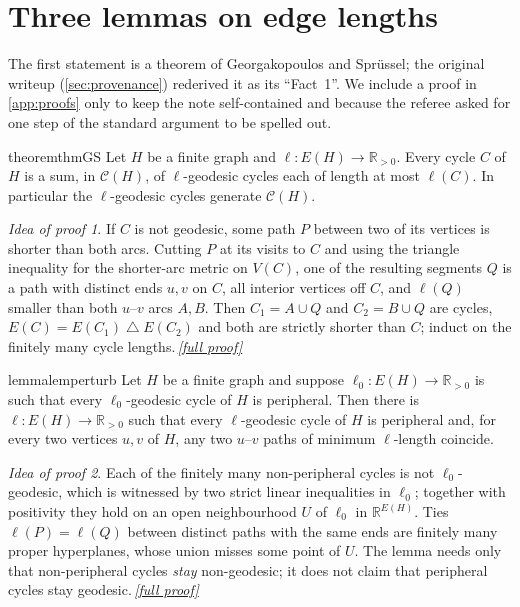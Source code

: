 \documentclass[11pt,a4paper]{article}
\theoremstyle{plain}
\theoremstyle{definition}
\theoremstyle{remark}
\newtheorem*{proofidea}{Idea of proof}
\newcommand{\fullproofref}[1]{\,\hyperref[#1]{\textit{[full proof]}}}
\newcommand{\R}{\mathbb R}
\newcommand{\cyc}{\mathcal C}
\newcommand{\symdiff}{\mathbin{\triangle}}
\begin{document}
\section{Three lemmas on edge lengths}

The first statement is a theorem of Georgakopoulos and Sprüssel; the original writeup (\cref{sec:provenance}) rederived it as its ``Fact~1''. We include a proof in \cref{app:proofs} only to keep the note self-contained and because the referee asked for one step of the standard argument to be spelled out.

\begin{restatable}{theorem}{thmGS}\label{thm:GS}
Let $H$ be a finite graph and $\ell\colon E(H)\to\R_{>0}$. Every cycle $C$ of $H$ is a sum, in $\cyc(H)$, of $\ell$-geodesic cycles each of length at most $\ell(C)$. In particular the $\ell$-geodesic cycles generate $\cyc(H)$.
\end{restatable}
\begin{proofidea}
If $C$ is not geodesic, some path $P$ between two of its vertices is shorter than both arcs. Cutting $P$ at its visits to $C$ and using the triangle inequality for the shorter-arc metric on $V(C)$, one of the resulting segments $Q$ is a path with distinct ends $u,v$ on $C$, all interior vertices off $C$, and $\ell(Q)$ smaller than both $u$--$v$ arcs $A,B$. Then $C_1=A\cup Q$ and $C_2=B\cup Q$ are cycles, $E(C)=E(C_1)\symdiff E(C_2)$ and both are strictly shorter than $C$; induct on the finitely many cycle lengths.\fullproofref{pf:GS}
\end{proofidea}

\begin{restatable}{lemma}{lemperturb}\label{lem:perturb}
Let $H$ be a finite graph and suppose $\ell_0\colon E(H)\to\R_{>0}$ is such that every $\ell_0$-geodesic cycle of $H$ is peripheral. Then there is $\ell\colon E(H)\to\R_{>0}$ such that every $\ell$-geodesic cycle of $H$ is peripheral and, for every two vertices $u,v$ of $H$, any two $u$--$v$ paths of minimum $\ell$-length coincide.
\end{restatable}
\begin{proofidea}
Each of the finitely many non-peripheral cycles is not $\ell_0$-geodesic, which is witnessed by two strict linear inequalities in $\ell_0$; together with positivity they hold on an open neighbourhood $U$ of $\ell_0$ in $\R^{E(H)}$. Ties $\ell(P)=\ell(Q)$ between distinct paths with the same ends are finitely many proper hyperplanes, whose union misses some point of $U$. The lemma needs only that non-peripheral cycles \emph{stay} non-geodesic; it does not claim that peripheral cycles stay geodesic.\fullproofref{pf:perturb}
\end{proofidea}
\end{document}
